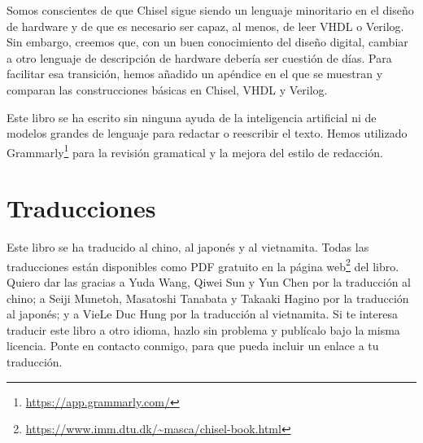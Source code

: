 \documentclass[%
    10pt,
    headinclude, footinclude=false,
    openright, %
    notitlepage,
    cleardoublepage=empty,
    headsepline,
    numbers=noenddot,
    bibliography=totoc, index=totoc,
    ]{scrbook}
\newcommand{\myref}[2]{\href{#1}{#2}}
\renewcommand{\myref}[2]{{#2}{\footnote{\url{#1}}}}
\begin{document}

Somos conscientes de que Chisel sigue siendo un lenguaje minoritario en el diseño de hardware y de que es necesario 
ser capaz, al menos, de leer VHDL o Verilog. Sin embargo, creemos que, con un buen conocimiento del diseño digital, 
cambiar a otro lenguaje de descripción de hardware debería ser cuestión de días. Para facilitar esa transición, 
hemos añadido un apéndice en el que se muestran y comparan las construcciones básicas en Chisel, VHDL y Verilog.


Este libro se ha escrito sin ninguna ayuda de la inteligencia artificial ni de modelos grandes de lenguaje para 
redactar o reescribir el texto. Hemos utilizado Grammarly\footnote{\url{https://app.grammarly.com/}} para la 
revisión gramatical y la mejora del estilo de redacción.

\section*{Traducciones}


Este libro se ha traducido al chino, al japonés y al vietnamita. Todas las traducciones están disponibles como PDF 
gratuito en la \myref{https://www.imm.dtu.dk/~masca/chisel-book.html}{página web} del libro. Quiero dar las gracias 
a Yuda Wang, Qiwei Sun y Yun Chen por la traducción al chino; a Seiji Munetoh, Masatoshi Tanabata y Takaaki Hagino 
por la traducción al japonés; y a VieLe Duc Hung por la traducción al vietnamita. Si te interesa traducir este libro 
a otro idioma, hazlo sin problema y publícalo bajo la misma licencia. Ponte en contacto conmigo, para que 
pueda incluir un enlace a tu traducción.
\end{document}
